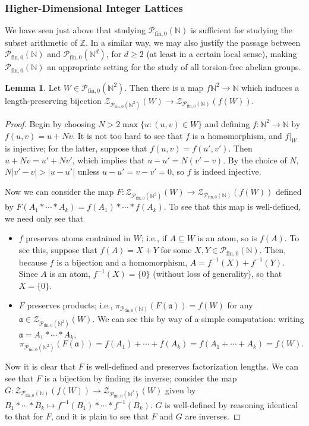 \documentclass{report}
\renewcommand{\aa}{\mathfrak{a}}
\newcommand{\NN}{\mathbb{N}}
\renewcommand{\P}{\mathcal{P}}
\newcommand{\ZZ}{\mathbb{Z}}
\newcommand{\Z}{\mathcal{Z}}
\newcommand{\fin}{\textrm{fin}}
\newcommand{\fon}{{\textrm{fin}, 0}}
\renewcommand{\:}{\text{:}}
\newcommand{\PN}{{\P_{\fin,0}(\NN)}}
\theoremstyle{definition}
\newtheorem{lemma}[defn]{Lemma}
\begin{document}
\subsubsection*{Higher-Dimensional Integer Lattices}

We have seen just above that studying $\PN$ is sufficient for studying the subset arithmetic of $\ZZ$.
In a similar way, we may also justify the passage between $\PN$ and $\P_\fon(\NN^d)$, for $d\ge 2$ (at least in a certain local sense), making $\PN$ an appropriate setting for the study of all torsion-free abelian groups.

\begin{lemma} \label{lem:passage to N2}
Let $W\in \P_\fon(\NN^2)$.
Then there is a map $f\NN^2 \to \NN$ which induces a length-preserving bijection $\Z_{\P_\fon(\NN^2)}(W) \to \Z_{\PN}(f(W))$.
\end{lemma}

\begin{proof}
Begin by choosing $N > 2\max\{ u : (u,v)\in W \}$ and defining $f: \NN^2 \to \NN$ by $f(u,v) = u + Nv$.
It is not too hard to see that $f$ is a homomorphism, and $f|_W$ is injective; for the latter, suppose that $f(u,v) = f(u',v')$.
Then $u+Nv = u'+Nv'$, which implies that $u-u' = N(v'-v)$.
By the choice of $N$, $N|v'-v| > |u-u'|$ unless $u-u' = v-v' = 0$, so $f$ is indeed injective.

Now we can consider the map $F:\Z_{\P_\fon(\NN^2)}(W) \to \Z_{\PN}(f(W))$ defined by $F(A_1*\cdots*A_k) = f(A_1)*\cdots*f(A_k)$.
To see that this map is well-defined, we need only see that
\begin{itemize}
\item $f$ preserves atoms contained in $W$; i.e., if $A\subseteq W$ is an atom, so is $f(A)$. 
To see this, suppose that $f(A) = X+Y$ for some $X,Y\in \PN$. 
Then, because $f$ is a bijection and a homomorphism, $A = f^{-1}(X) + f^{-1}(Y)$.
Since $A$ is an atom, $f^{-1}(X) = \{0\}$ (without loss of generality), so that $X = \{0\}$.
\item $F$ preserves products; i.e., $\pi_{\PN}(F(\aa)) = f(W)$ for any $\aa\in\Z_{\P_\fon(\NN^2)}(W)$.
We can see this by way of a simple computation: writing $\aa = A_1*\cdots*A_k$,
\[ \pi_{\P_\fon(\NN^2)}(F(\aa)) 
= f(A_1) + \cdots + f(A_k) 
= f(A_1+\cdots+ A_k) 
= f(W). \]
\end{itemize}
Now it is clear that $F$ is well-defined and preserves factorization lengths.  
We can see that $F$ is a bijection by finding its inverse; consider the map $G: \Z_{\PN}(f(W)) \to \Z_{\P_\fon(\NN^2)}(W)$ given by $B_1*\cdots*B_k\mapsto f^{-1}(B_1)*\cdots*f^{-1}(B_k)$.
$G$ is well-defined by reasoning identical to that for $F$, and it is plain to see that $F$ and $G$ are inverses.
\end{proof}
\end{document}
